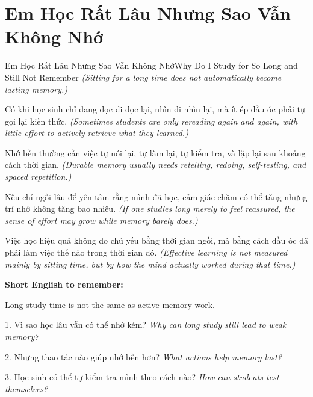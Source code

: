 \section{Em Học Rất Lâu Nhưng Sao Vẫn Không Nhớ}
\begin{truyen}{Em Học Rất Lâu Nhưng Sao Vẫn Không Nhớ}{Why Do I Study for So Long and Still Not Remember}
\textit{(Sitting for a long time does not automatically become lasting memory.)}

Có khi học sinh chỉ đang đọc đi đọc lại, nhìn đi nhìn lại, mà ít ép đầu óc phải tự gọi lại kiến thức.
\textit{(Sometimes students are only rereading again and again, with little effort to actively retrieve what they learned.)}

Nhớ bền thường cần việc tự nói lại, tự làm lại, tự kiểm tra, và lặp lại sau khoảng cách thời gian.
\textit{(Durable memory usually needs retelling, redoing, self-testing, and spaced repetition.)}

Nếu chỉ ngồi lâu để yên tâm rằng mình đã học, cảm giác chăm có thể tăng nhưng trí nhớ không tăng bao nhiêu.
\textit{(If one studies long merely to feel reassured, the sense of effort may grow while memory barely does.)}
\end{truyen}

\begin{baihoc}
Việc học hiệu quả không đo chủ yếu bằng thời gian ngồi, mà bằng cách đầu óc đã phải làm việc thế nào trong thời gian đó.
\textit{(Effective learning is not measured mainly by sitting time, but by how the mind actually worked during that time.)}
\end{baihoc}

\begin{ghinhoanh}
\textbf{Short English to remember:}

Long study time is not the same as active memory work.

\end{ghinhoanh}

\begin{tuhocnhanh}
1. Vì sao học lâu vẫn có thể nhớ kém? \textit{Why can long study still lead to weak memory?}

2. Những thao tác nào giúp nhớ bền hơn? \textit{What actions help memory last?}

3. Học sinh có thể tự kiểm tra mình theo cách nào? \textit{How can students test themselves?}
\end{tuhocnhanh}
\ngancach


